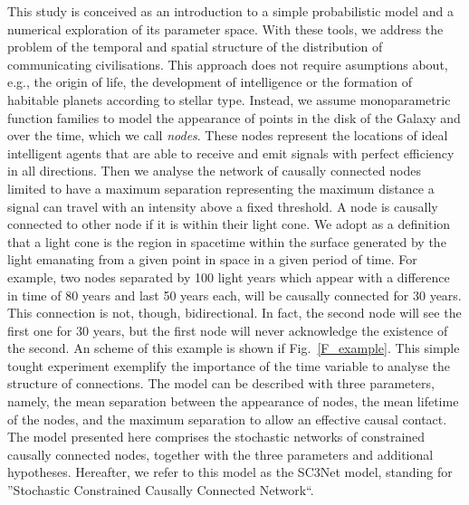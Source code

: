 \documentclass[crop]{CSLB}
\begin{document}

This study is conceived as an introduction to a simple probabilistic
model and a numerical exploration of its parameter space.
%
With these tools, we address the problem of the temporal and spatial
structure of the distribution of communicating civilisations.
%
This approach does not require asumptions about, e.g., the origin of
life, the development of intelligence or the formation of habitable
planets according to stellar type.
%
Instead, we assume monoparametric function families to model the
appearance of points in the disk of the Galaxy and over the time,
which we call \textit{nodes}.
%
These nodes represent the locations of ideal intelligent agents that
are able to receive and emit signals with perfect efficiency in all
directions.
%
Then we analyse the network of causally connected nodes limited to
have a maximum separation representing the maximum distance a signal
can travel with an intensity above a fixed threshold.
%
A node is causally connected to other node if it is within their light
cone.
%
We adopt as a definition that a light cone is the region in spacetime
within the surface generated by the light emanating from a given point
in space in a given period of time.
%
For example, two nodes separated by 100 light years which appear with
a difference in time of 80 years and last 50 years each, will be
causally connected for 30 years.
%
This connection is not, though, bidirectional.
%
In fact, the second node will see the first one for 30 years, but the
first node will never acknowledge the existence of the second.
%
An scheme of this example is shown if Fig.~\ref{F_example}.
%
This simple tought experiment exemplify the importance of the time
variable to analyse the structure of connections.
%
The model can be described with three parameters, namely, the mean
separation between the appearance of nodes, the mean lifetime of the
nodes, and the maximum separation to allow an effective causal
contact.
%
The model presented here comprises the stochastic networks of
constrained causally connected nodes, together with the three
parameters and additional hypotheses.
%
Hereafter, we refer to this model as the SC3Net model, standing for
''Stochastic Constrained Causally Connected Network``.
\end{document}

